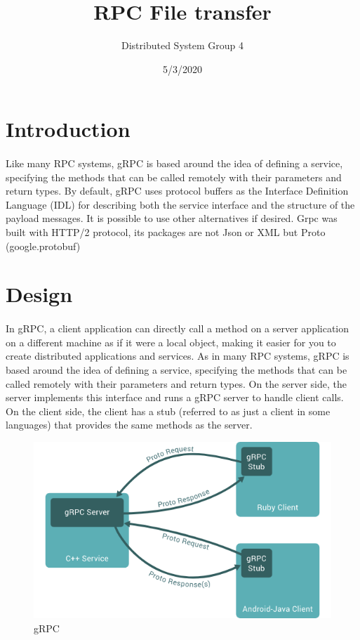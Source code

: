 \documentclass{article}
\title{RPC File transfer}
\date{5/3/2020}
\author{Distributed System Group 4}
\begin{document}
\maketitle
{}
\newpage
\tableofcontents
\newpage
{}


\section{Introduction}
\paragraph{}
Like many RPC systems, gRPC is based around the idea of defining a service, specifying the methods that can be called remotely with their parameters and return types. By default, gRPC uses protocol buffers as the Interface Definition Language (IDL) for describing both the service interface and the structure of the payload messages. It is possible to use other alternatives if desired. \newline
Grpc was built with HTTP/2 protocol, its packages are not Json or XML but Proto (google.protobuf)

\section{Design}
\paragraph{}
In gRPC, a client application can directly call a method on a server application on a different machine as if it were a local object, making it easier for you to create distributed applications and services. As in many RPC systems, gRPC is based around the idea of defining a service, specifying the methods that can be called remotely with their parameters and return types. On the server side, the server implements this interface and runs a gRPC server to handle client calls. On the client side, the client has a stub (referred to as just a client in some languages) that provides the same methods as the server.

    \begin{figure}[H]
    \includegraphics[width=\linewidth]{grpc.png}
    \caption{gRPC}
    \end{figure}
\end{document}
